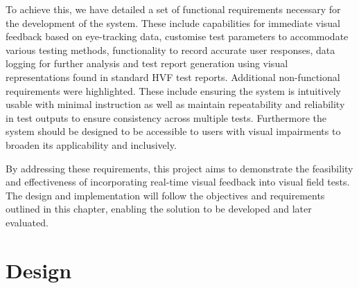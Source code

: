 \documentclass{l4proj}
\begin{document}
To achieve this, we have detailed a set of functional requirements necessary for the development of the system. These include capabilities for immediate visual feedback based on eye-tracking data, customise test parameters to accommodate various testing methods, functionality to record accurate user responses, data logging for further analysis and test report generation using visual representations found in standard HVF test reports.
Additional non-functional requirements were highlighted. These include ensuring the system is intuitively usable with minimal instruction as well as maintain repeatability and reliability in test outputs to ensure consistency across multiple tests. Furthermore the system should be designed to be accessible to users with visual impairments to broaden its applicability and inclusively.

By addressing these requirements, this project aims to demonstrate the feasibility and effectiveness of incorporating real-time visual feedback into visual field tests. The design and implementation will follow the objectives and requirements outlined in this chapter, enabling the solution to be developed and later evaluated.

\chapter{Design}
\end{document}

